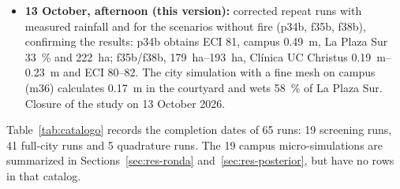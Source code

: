 \begin{itemize}
\begin{itemize}
\item estimated burn severity from dNBR and response of volume and city scenarios (f35, f38);
\item \emph{bike park} (mrbc, mrbt), hypothetical tree obstacle (arc, art) and size-based porosity (d39);
\item correction of the 6 and 7 October rainfall at Tobalaba;
\item detection and correction of a numerical mass artifact (Section~\ref{sec:res-posterior}).
\end{itemize}
\item \textbf{13 October, afternoon (this version):} corrected repeat runs with measured rainfall and for the scenarios without fire (p34b, f35b, f38b), confirming the results: p34b obtains ECI 81, campus \SI{0.49}{m}, La Plaza Sur \SI{33}{\percent} and \SI{222}{ha}; f35b/f38b, \SIrange{179}{193}{ha}, Clínica UC Christus \SIrange{0.19}{0.23}{m} and ECI 80--82. The city simulation with a fine mesh on campus (m36) calculates \SI{0.17}{m} in the courtyard and wets \SI{58}{\percent} of La Plaza Sur. Closure of the study on 13 October 2026.
\end{itemize}
Table~\ref{tab:catalogo} records the completion dates of 65 runs: 19 screening runs, 41 full-city runs and 5 quadrature runs. The 19 campus micro-simulations are summarized in Sections~\ref{sec:res-ronda} and~\ref{sec:res-posterior}, but have no rows in that catalog.



